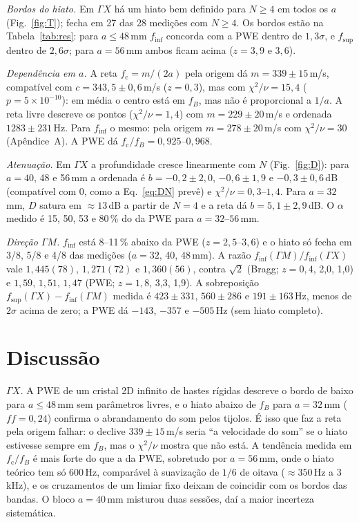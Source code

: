 \documentclass[10pt,twocolumn,a4paper]{article}
\newcommand{\GX}{\Gamma X}
\newcommand{\GM}{\Gamma M}
\newcommand{\finf}{f_\text{inf}}
\newcommand{\fsup}{f_\text{sup}}
\newcommand{\fc}{f_\text{c}}
\begin{document}
\emph{Bordos do hiato.} Em $\GX$ há um hiato bem definido para $N\ge4$ em todos os $a$
(Fig.~\ref{fig:T}); fecha em 27 das 28 medições com $N\ge4$. Os bordos estão na
Tabela~\ref{tab:res}: para $a\le48$\,mm $\finf$ concorda com a PWE dentro de $1{,}3\sigma$, e $\fsup$
dentro de $2{,}6\sigma$; para $a=56$\,mm ambos ficam acima ($z=3{,}9$ e $3{,}6$).

\emph{Dependência em $a$.} A reta $\fc=m/(2a)$ pela origem dá $m=339\pm15$\,m/s, compatível com
$c=343{,}5\pm0{,}6$\,m/s ($z=0{,}3$), mas com $\chi^2/\nu=15{,}4$ ($p=5\times10^{-10}$): em média o
centro está em $f_B$, mas não é proporcional a $1/a$. A reta livre descreve os pontos
($\chi^2/\nu=1{,}4$) com $m=229\pm20$\,m/s e ordenada $1283\pm231$\,Hz. Para $\finf$ o mesmo:
pela origem $m=278\pm20$\,m/s com $\chi^2/\nu=30$ (Apêndice~A). A PWE dá $\fc/f_B=0{,}925$--$0{,}968$.

\emph{Atenuação.} Em $\GX$ a profundidade cresce linearmente com $N$ (Fig.~\ref{fig:D}): para
$a=40$, 48 e 56\,mm a ordenada é $b=-0{,}2\pm2{,}0$, $-0{,}6\pm1{,}9$ e $-0{,}3\pm0{,}6$\,dB
(compatível com 0, como a Eq.~\eqref{eq:DN} prevê) e $\chi^2/\nu=0{,}3$--$1{,}4$. Para $a=32$\,mm, $D$
satura em ${\approx}13$\,dB a partir de $N=4$ e a reta dá $b=5{,}1\pm2{,}9$\,dB. O $\alpha$ medido é
15, 50, 53 e 80\,\% do da PWE para $a=32$--$56$\,mm.

\emph{Direção $\GM$.} $\finf$ está 8--11\,\% abaixo da PWE ($z=2{,}5$--$3{,}6$) e o hiato só fecha em
3/8, 5/8 e 4/8 das medições ($a=32$, 40, 48\,mm). A razão $\finf(\GM)/\finf(\GX)$ vale
$1{,}445(78)$, $1{,}271(72)$ e $1{,}360(56)$, contra $\sqrt2$ (Bragg; $z=0{,}4$, 2,0, 1,0) e
$1{,}59$, $1{,}51$, $1{,}47$ (PWE; $z=1{,}8$, 3,3, 1,9).
A sobreposição $\fsup(\GX)-\finf(\GM)$ medida é $423\pm331$, $560\pm286$ e $191\pm163$\,Hz,
menos de $2\sigma$ acima de zero; a PWE dá $-143$, $-357$ e $-505$\,Hz (sem hiato completo).

\section{Discussão}
\emph{$\GX$.} A PWE de um cristal 2D infinito de hastes rígidas descreve o bordo de baixo para
$a\le48$\,mm sem parâmetros livres, e o hiato abaixo de $f_B$ para $a=32$\,mm ($f\!f=0{,}24$) confirma
o abrandamento do som pelos tijolos. É isso que faz a reta pela origem falhar: o declive
$339\pm15$\,m/s seria ``a velocidade do som'' se o hiato estivesse sempre em $f_B$, mas o $\chi^2/\nu$
mostra que não está. A tendência medida em $\fc/f_B$ é mais forte do que a da PWE, sobretudo por
$a=56$\,mm, onde o hiato teórico tem só 600\,Hz, comparável à suavização de $1/6$ de oitava
(${\approx}350$\,Hz a 3\,kHz), e os cruzamentos de um limiar fixo deixam de coincidir com os bordos
das bandas. O bloco $a=40$\,mm misturou duas sessões, daí a maior incerteza sistemática.
\end{document}
